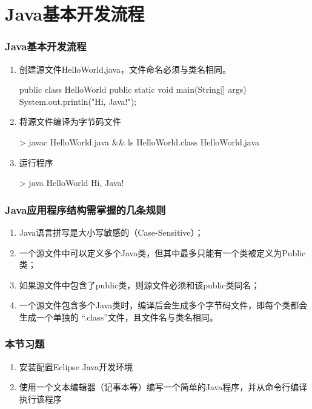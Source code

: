 \section{Java基本开发流程}
\begin{frame}[fragile] %
\frametitle{Java基本开发流程}
\begin{enumerate}[<+-| structure@+>]
\item 创建源文件HelloWorld.java，文件命名必须与类名相同。
\begin{javaCode}
public class HelloWorld {
    public static void main(String[] args) {
	System.out.println("Hi, Java!");
    }
}   
\end{javaCode}
\item 将源文件编译为字节码文件
\begin{shCode}
> javac HelloWorld.java && ls 
HelloWorld.class  HelloWorld.java
\end{shCode}
\item 运行程序
\begin{shCode}
> java HelloWorld 
Hi, Java!
\end{shCode}
\end{enumerate}
\end{frame}

\begin{frame}[fragile] %
\frametitle{Java应用程序结构需掌握的几条规则}

\begin{enumerate}[<+-| alert@+>]
\item Java语言拼写是大小写敏感的（Case-Sensitive）；
\item 一个源文件中可以定义多个Java类，但其中最多只能有一个类被定义为Public类；
\item 如果源文件中包含了public类，则源文件必须和该public类同名；
\item 一个源文件包含多个Java类时，编译后会生成多个字节码文件，即每个类都会生成一个单独的
  “.class”文件，且文件名与类名相同。
\end{enumerate}
\end{frame}

\begin{frame}
 \frametitle{本节习题}
 \begin{enumerate}
 \item 安装配置Eclipse Java开发环境
 \item 使用一个文本编辑器（记事本等）编写一个简单的Java程序，并从命令行编译执行该程序
 \end{enumerate}
\end{frame}


